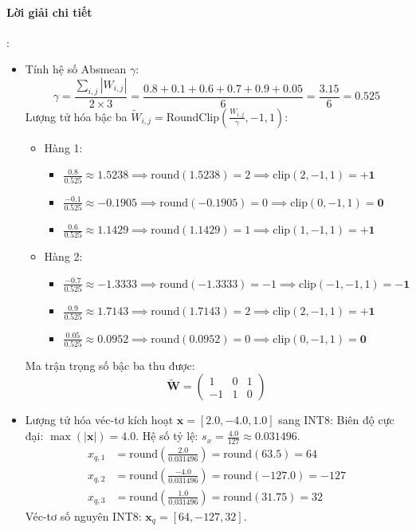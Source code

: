 \paragraph{Lời giải chi tiết}:
\begin{itemize}
  \item[1)] Tính hệ số Absmean $\gamma$:
  \begin{equation*}
  \gamma = \frac{\sum_{i,j} |W_{i,j}|}{2 \times 3} = \frac{0.8 + 0.1 + 0.6 + 0.7 + 0.9 + 0.05}{6} = \frac{3.15}{6} = 0.525
  \end{equation*}
  Lượng tử hóa bậc ba $\widetilde{W}_{i,j} = \text{RoundClip}\left(\frac{W_{i,j}}{\gamma}, -1, 1\right)$:
  \begin{itemize}
    \item Hàng 1:
      \begin{itemize}
        \item $\frac{0.8}{0.525} \approx 1.5238 \implies \text{round}(1.5238) = 2 \implies \text{clip}(2, -1, 1) = \mathbf{+1}$
        \item $\frac{-0.1}{0.525} \approx -0.1905 \implies \text{round}(-0.1905) = 0 \implies \text{clip}(0, -1, 1) = \mathbf{0}$
        \item $\frac{0.6}{0.525} \approx 1.1429 \implies \text{round}(1.1429) = 1 \implies \text{clip}(1, -1, 1) = \mathbf{+1}$
      \end{itemize}
    \item Hàng 2:
      \begin{itemize}
        \item $\frac{-0.7}{0.525} \approx -1.3333 \implies \text{round}(-1.3333) = -1 \implies \text{clip}(-1, -1, 1) = \mathbf{-1}$
        \item $\frac{0.9}{0.525} \approx 1.7143 \implies \text{round}(1.7143) = 2 \implies \text{clip}(2, -1, 1) = \mathbf{+1}$
        \item $\frac{0.05}{0.525} \approx 0.0952 \implies \text{round}(0.0952) = 0 \implies \text{clip}(0, -1, 1) = \mathbf{0}$
      \end{itemize}
  \end{itemize}
  Ma trận trọng số bậc ba thu được:
  \begin{equation*}
  \widetilde{\mathbf{W}} = \begin{pmatrix} 1 & 0 & 1 \\ -1 & 1 & 0 \end{pmatrix}
  \end{equation*}

  \item[2)] Lượng tử hóa véc-tơ kích hoạt $\mathbf{x} = [2.0, -4.0, 1.0]$ sang INT8:
  Biên độ cực đại: $\max(|\mathbf{x}|) = 4.0$. Hệ số tỷ lệ: $s_x = \frac{4.0}{127} \approx 0.031496$.
  \begin{align*}
  x_{q, 1} &= \text{round}\left(\frac{2.0}{0.031496}\right) = \text{round}(63.5) = 64 \\
  x_{q, 2} &= \text{round}\left(\frac{-4.0}{0.031496}\right) = \text{round}(-127.0) = -127 \\
  x_{q, 3} &= \text{round}\left(\frac{1.0}{0.031496}\right) = \text{round}(31.75) = 32
  \end{align*}
  Véc-tơ số nguyên INT8: $\mathbf{x}_q = [64, -127, 32]$.


\end{itemize}
